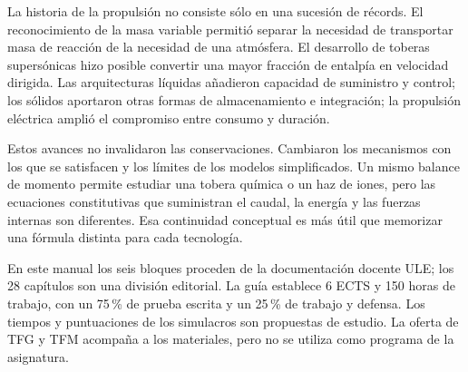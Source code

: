 La historia de la propulsión no consiste sólo en una sucesión de récords. El reconocimiento de la masa variable permitió separar la necesidad de transportar masa de reacción de la necesidad de una atmósfera. El desarrollo de toberas supersónicas hizo posible convertir una mayor fracción de entalpía en velocidad dirigida. Las arquitecturas líquidas añadieron capacidad de suministro y control; los sólidos aportaron otras formas de almacenamiento e integración; la propulsión eléctrica amplió el compromiso entre consumo y duración.

Estos avances no invalidaron las conservaciones. Cambiaron los mecanismos con los que se satisfacen y los límites de los modelos simplificados. Un mismo balance de momento permite estudiar una tobera química o un haz de iones, pero las ecuaciones constitutivas que suministran el caudal, la energía y las fuerzas internas son diferentes. Esa continuidad conceptual es más útil que memorizar una fórmula distinta para cada tecnología.

En este manual los seis bloques proceden de la documentación docente ULE; los 28 capítulos son una división editorial. La guía establece 6 ECTS y 150 horas de trabajo, con un 75\,\% de prueba escrita y un 25\,\% de trabajo y defensa. Los tiempos y puntuaciones de los simulacros son propuestas de estudio. La oferta de TFG y TFM acompaña a los materiales, pero no se utiliza como programa de la asignatura.\cite{GUIA2026,ULE-PRES}
